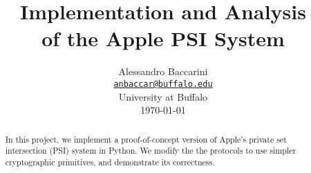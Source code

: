 \documentclass[11pt,letterpaper,oneside]{article}
\title{
Implementation and Analysis\\ 
 of the Apple PSI System \\
 \cite{bhowmick2021apple}
 }
\author{Alessandro Baccarini \\
\small{\href{mailto:anbaccar@buffalo.edu}{\texttt{anbaccar@buffalo.edu}}} \\
\small{University at Buffalo} \\ 
\small{\today} 
 \vspace{-1.5cm}
}
\date{}
\begin{document}
\maketitle


\begin{abstract}
In this project, we implement a proof-of-concept version of Apple's private set intersection (PSI) system in Python. We modify the the protocols to use simpler cryptographic primitives, and demonstrate its correctness.
\end{abstract}







% 



% 



% 
\end{document}
